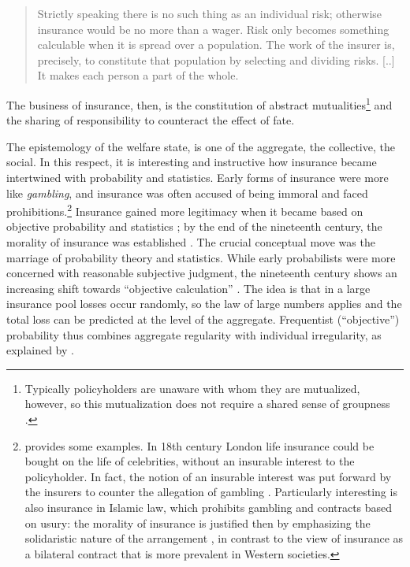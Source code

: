 \documentclass[11pt]{article} %
\begin{document}
\begin{quote}
Strictly speaking there is no such thing as an individual risk; otherwise insurance would be no more than a wager. Risk only becomes something calculable when it is spread over a population. The work of the insurer is, precisely, to constitute that population by selecting and dividing risks. [..] It makes each person a part of the whole.
\end{quote}
The business of insurance, then, is the constitution of abstract mutualities\footnote{Typically policyholders are unaware with whom they are mutualized, however, so this mutualization does not require a shared sense of groupness \citep{krippner2022person}.} \citep{lehtonen2011forms} and the sharing of responsibility to counteract the effect of fate.


The epistemology of the welfare state, is one of the aggregate, the collective, the social. In this respect, it is interesting and instructive how insurance became intertwined with probability and statistics.
Early forms of insurance were more like \textit{gambling}, and insurance was often accused of being immoral and faced prohibitions.\footnote{\citet{cooper2009probability} provides some examples. In 18th century London life insurance could be bought on the life of celebrities, without an insurable interest to the policyholder. In fact, the notion of an insurable interest was put forward by the insurers to counter the allegation of gambling \citep{baker1996genealogy,mcfall2018or}. Particularly interesting is also insurance in Islamic law, which prohibits gambling and contracts based on usury: the morality of insurance is justified then by emphasizing the solidaristic nature of the arrangement \citep{baker2002risk}, in contrast to the view of insurance as a bilateral contract that is more prevalent in Western societies.} Insurance gained more legitimacy when it became based on objective probability and statistics \citep[p.\@\xspace 162ff]{daston2023classical}; by the end of the nineteenth century, the morality of insurance was established \citep{baker1996genealogy}.
The crucial conceptual move was the marriage of probability theory and statistics. While early probabilists were more concerned with reasonable subjective judgment, the nineteenth century shows an increasing shift towards ``objective calculation'' \citep{mcfall2011good}. The idea is that in a large insurance pool losses occur randomly, so the law of large numbers applies and the total loss can be predicted at the level of the aggregate. Frequentist (``objective'') probability thus combines aggregate regularity with individual irregularity, as explained by \citet[p.\@\xspace 4]{Venn1876}.
\end{document}
